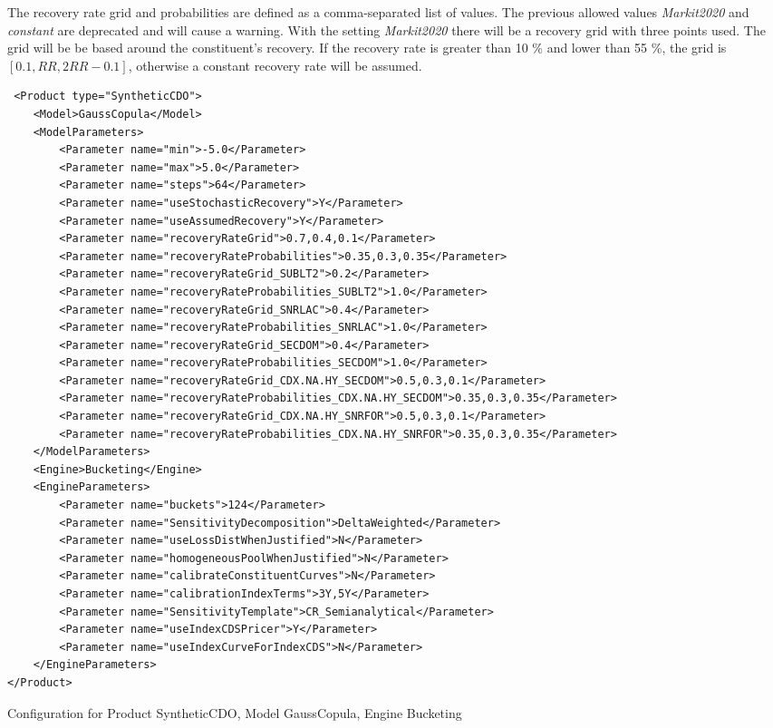 The recovery rate grid and probabilities are defined as a comma-separated list of values. The previous allowed values \emph{Markit2020} and \emph{constant} are deprecated and
will cause a warning. With the setting \emph{Markit2020} there will be a recovery grid with three points used. The grid will be be based around the constituent's recovery. If the recovery rate
is greater than 10 \% and lower than 55 \%,  the grid is $[0.1, RR, 2 RR - 0.1]$, otherwise a constant recovery rate will be assumed.

\begin{longlisting}
\begin{verbatim}
 <Product type="SyntheticCDO">
    <Model>GaussCopula</Model>
    <ModelParameters>
        <Parameter name="min">-5.0</Parameter>
        <Parameter name="max">5.0</Parameter>
        <Parameter name="steps">64</Parameter>
        <Parameter name="useStochasticRecovery">Y</Parameter>
        <Parameter name="useAssumedRecovery">Y</Parameter>
        <Parameter name="recoveryRateGrid">0.7,0.4,0.1</Parameter>
        <Parameter name="recoveryRateProbabilities">0.35,0.3,0.35</Parameter>
        <Parameter name="recoveryRateGrid_SUBLT2">0.2</Parameter>
        <Parameter name="recoveryRateProbabilities_SUBLT2">1.0</Parameter>
        <Parameter name="recoveryRateGrid_SNRLAC">0.4</Parameter>
        <Parameter name="recoveryRateProbabilities_SNRLAC">1.0</Parameter>
        <Parameter name="recoveryRateGrid_SECDOM">0.4</Parameter>
        <Parameter name="recoveryRateProbabilities_SECDOM">1.0</Parameter>
        <Parameter name="recoveryRateGrid_CDX.NA.HY_SECDOM">0.5,0.3,0.1</Parameter>
        <Parameter name="recoveryRateProbabilities_CDX.NA.HY_SECDOM">0.35,0.3,0.35</Parameter>
        <Parameter name="recoveryRateGrid_CDX.NA.HY_SNRFOR">0.5,0.3,0.1</Parameter>
        <Parameter name="recoveryRateProbabilities_CDX.NA.HY_SNRFOR">0.35,0.3,0.35</Parameter>
    </ModelParameters>
    <Engine>Bucketing</Engine>
    <EngineParameters>
        <Parameter name="buckets">124</Parameter>
        <Parameter name="SensitivityDecomposition">DeltaWeighted</Parameter>
        <Parameter name="useLossDistWhenJustified">N</Parameter>
        <Parameter name="homogeneousPoolWhenJustified">N</Parameter>
        <Parameter name="calibrateConstituentCurves">N</Parameter>
        <Parameter name="calibrationIndexTerms">3Y,5Y</Parameter>
        <Parameter name="SensitivityTemplate">CR_Semianalytical</Parameter>
        <Parameter name="useIndexCDSPricer">Y</Parameter>
        <Parameter name="useIndexCurveForIndexCDS">N</Parameter>
    </EngineParameters>
</Product>
\end{verbatim}
\caption{Configuration for Product SyntheticCDO, Model GaussCopula, Engine Bucketing}
\label{lst:peconfig_SyntheticCDO_GaussCopula_Bucketing}
\end{longlisting}

